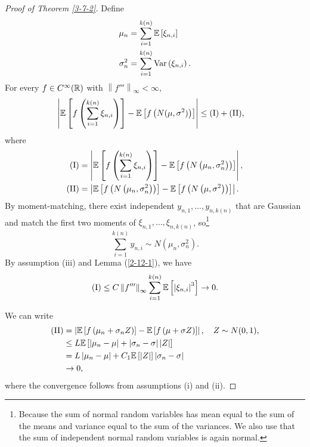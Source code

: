 \theoremproofstyle
\begin{proof}[Proof of Theorem \ref{3-7-2}]
	Define
	\begin{align*}
		\mu_n &= \sum\limits_{i=1}^{k(n)}  \mathbb{E}\left[\xi_{n,i}\right]  \\
		\sigma_n^2 &= \sum\limits_{i=1}^{k(n)} \operatorname{Var}\left(\xi_{n,i}\right)
	.\end{align*}
		For every $f \in C^\infty(\mathbb{R})$ with $\left\|f'''\right\|_\infty < \infty$, 
		\begin{align*}
			\left| \mathbb{E}\left[f\left( \sum\limits_{i=1}^{k(n)} \xi_{n,i} \right)\right] - \mathbb{E}\left[f\left( N(\mu,\sigma^2) \right)\right]  \right|
			&\le \text{(I)} + \text{(II)},
		\end{align*}
		where
		\begin{align*}
			\text{(I)}
			&= \left|  \mathbb{E}\left[f\left( \sum\limits_{i=1}^{k(n)} \xi_{n,i} \right)\right] - \mathbb{E}\left[f\left( N\left( \mu_n, \sigma_n^2 \right) \right)\right]  \right|, \\
			\text{(II)}
			&= \left| \mathbb{E}\left[f\left( N\left( \mu_n, \sigma_n^2 \right) \right)\right] - \mathbb{E}\left[f\left( N\left( \mu, \sigma^2 \right) \right)\right]  \right|.
		\end{align*}
	By moment-matching, there exist independent $y_{n,1},\ldots,y_{n,k(n)}$ that are Gaussian and match the first two moments of $\xi_{n,1},\ldots,\xi_{n,k(n)}$, so\footnote{Because the sum of normal random variables has mean equal to the sum of the means and variance equal to the sum of the variances. We also use that the sum of independent normal random variables is again normal.} \[
		\sum\limits_{i=1}^{k(n)} y_{n,i} \sim N\left( \mu_n, \sigma_n^2 \right)
	.\] By assumption (iii) and Lemma (\ref{2-12-1}), we have \[
	\text{(I)} \le C \left\|f'''\right\|_\infty \sum\limits_{i=1}^{k(n)} \mathbb{E}\left[\left| \xi_{n,i} \right|^3\right] \to 0
	.\] 
	
	We can write
	\begin{align*}
		\text{(II)}
		&= \left| \mathbb{E}\left[f\left( \mu_n + \sigma_n Z \right)\right]  - \mathbb{E}\left[f\left( \mu+\sigma Z \right)\right]  \right|, \quad Z \sim N(0,1), \\
		&\le L \mathbb{E}\left[\left| \mu_n - \mu \right| + \left| \sigma_n - \sigma \right| \left| Z \right|\right] \\
		&= L \left| \mu_n - \mu \right| + C_1 \mathbb{E}\left[\left| Z \right|\right] \left| \sigma_n - \sigma \right| \\
		&\to 0		
	,\end{align*}
	where the convergence follows from assumptions (i) and (ii).
\end{proof}

